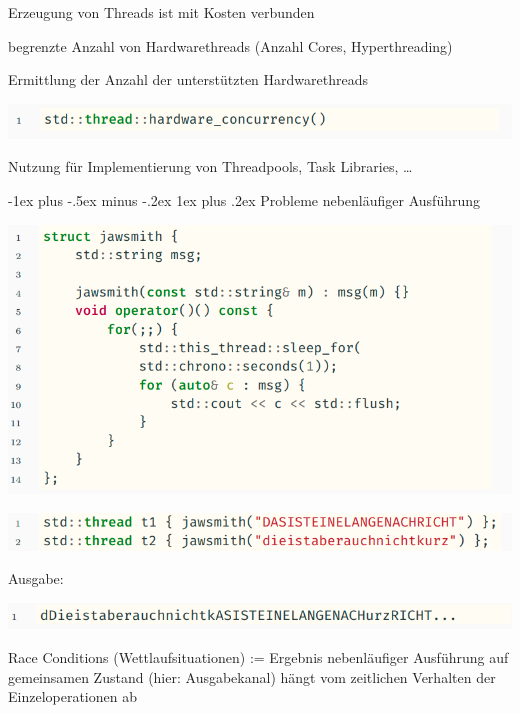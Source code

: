 \documentclass[10pt]{article}
\makeatletter
\renewcommand{\subsubsection}{\@startsection{subsubsection}{3}{0mm}%
                                {-1ex plus -.5ex minus -.2ex}%
                                {1ex plus .2ex}%
                                {\normalfont\small\bfseries}}
\makeatother
\begin{document}
  \begin{itemize*}
    \item Erzeugung von Threads ist mit Kosten verbunden
    \item begrenzte Anzahl von Hardwarethreads (Anzahl Cores, Hyperthreading)
    \item Ermittlung der Anzahl der unterstützten Hardwarethreads
  \end{itemize*}
  \begin{center}
    \includegraphics[width=0.7\linewidth]{Assets/Programmierparadigmen-code-snippet-20}
  \end{center}
  \begin{itemize*}
    \item Nutzung für Implementierung von Threadpools, Task Libraries, …
  \end{itemize*}
  
  \subsubsection{Probleme nebenläufiger Ausführung}
  \begin{center}
    \includegraphics[width=0.7\linewidth]{Assets/Programmierparadigmen-code-snippet-21}
  \end{center}
  \begin{center}
    \includegraphics[width=0.7\linewidth]{Assets/Programmierparadigmen-code-snippet-22}
  \end{center}
  Ausgabe:
  \begin{center}
    \includegraphics[width=0.7\linewidth]{Assets/Programmierparadigmen-code-snippet-23}
  \end{center}
  \color{orange} Race Conditions \color{black}(Wettlaufsituationen) := Ergebnis nebenläufiger Ausführung auf gemeinsamen Zustand (hier: Ausgabekanal) hängt vom zeitlichen Verhalten der Einzeloperationen ab
  
\end{document}
